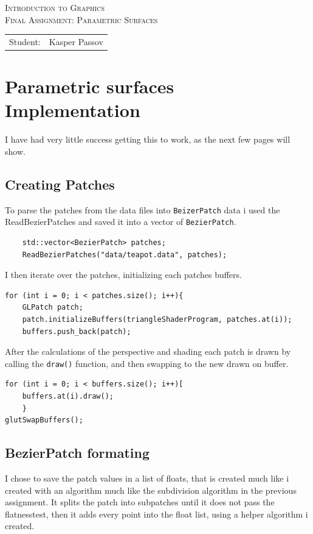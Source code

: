 \documentclass{article}
\begin{document}
\begin{titlepage}
\begin{center}
\textsc{Introduction to Graphics}\\[0.5cm]
\textsc{Final Assignment: Parametric Surfaces}\\[0.5cm]
\vspace{2 cm}
\begin{tabular}{ll}
Student: & Kasper Passov\\
\end{tabular}
\end{center}
\vspace{5 cm}
\newpage
\end{titlepage}


\section{Parametric surfaces Implementation}
I have had very little success getting this to work, as the next few pages will show.

\subsection{Creating Patches}
To parse the patches from the data files into \texttt{BeizerPatch} data i used the ReadBezierPatches
and saved it into a vector of \texttt{BezierPatch}.
\begin{verbatim}
    std::vector<BezierPatch> patches;
    ReadBezierPatches("data/teapot.data", patches);
\end{verbatim}
I then iterate over the patches, initializing each patches buffers.
\begin{verbatim}
for (int i = 0; i < patches.size(); i++){
    GLPatch patch;
    patch.initializeBuffers(triangleShaderProgram, patches.at(i));
    buffers.push_back(patch);
\end{verbatim}
After the calculations of the perspective and shading each patch
is drawn by calling the \texttt{draw()} function, and then swapping
to the new drawn on buffer.
\begin{verbatim}
for (int i = 0; i < buffers.size(); i++)[
    buffers.at(i).draw();
    }
glutSwapBuffers();
\end{verbatim}

\subsection{BezierPatch formating}
I chose to save the patch values in a list of floats, that is created
much like i created with an algorithm much like the subdivision algorithm
in the previous assignment. It splits the patch into subpatches until it
does not pass the flatnesstest, then it adds every point into the float list,
using a helper algorithm i created. 
\end{document}
